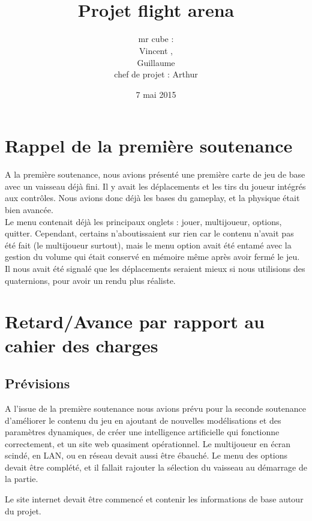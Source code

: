 \documentclass[10pt, titlepage]{report}
\title{\bsc{Rapport de la deuxième soutenance}\\Projet flight arena}
\author{mr cube :\\
Vincent \bsc{Rospini-Clerici},\\
Guillaume \bsc{Rebut}\\
chef de projet : Arthur \bsc{Remaud}}
\date{7 mai 2015}
\begin{document}
\maketitle
\renewcommand{\contentsname}{Sommaire}
\renewcommand{\chaptername}{Partie}

\tableofcontents

\chapter{Rappel de la première soutenance}

A la première soutenance, nous avions présenté une première carte de jeu de base avec un vaisseau déjà fini. Il y avait les déplacements et les tirs du joueur intégrés aux contrôles. Nous avions donc déjà les bases du gameplay, et la physique était bien avancée.\\

Le menu contenait déjà les principaux onglets : jouer, multijoueur, options, quitter. Cependant, certains n'aboutissaient sur rien car le contenu n'avait pas été fait (le multijoueur surtout), mais le menu option avait été entamé avec la gestion du volume qui était conservé en mémoire même après avoir fermé le jeu.\\

Il nous avait été signalé que les déplacements seraient mieux si nous utilisions des quaternions, pour avoir un rendu plus réaliste.\\

\chapter{Retard/Avance par rapport au cahier des charges}

\section{Prévisions}
A l'issue de la première soutenance nous avions prévu pour la seconde soutenance d'améliorer le contenu du jeu en ajoutant de nouvelles modélisations et des paramètres dynamiques, de créer une intelligence artificielle qui fonctionne correctement, et un site web quasiment opérationnel. Le multijoueur en écran scindé, en LAN, ou en réseau devait aussi être ébauché. Le menu des options devait être complété, et il fallait rajouter la sélection du vaisseau au démarrage de la partie.

Le site internet devait être commencé et contenir les informations de base autour du projet.\\
\end{document}
